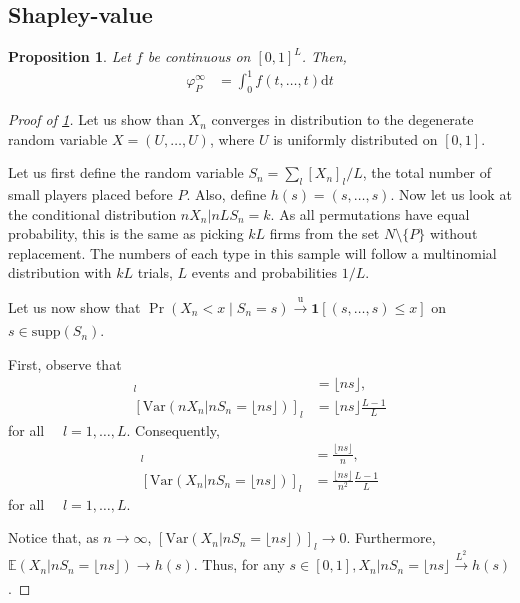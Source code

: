 \documentclass[a4paper]{article}
\newtheorem{proposition}{Proposition}
\newcommand{\dt}{\mathrm{d}t}
\newcommand{\E}{\mathbb{E}}
\newcommand{\Var}{\mathrm{Var}}
\begin{document}
\subsection{Shapley-value}

\begin{proposition}
    \label{prop:many_sided_shapley}
    Let $f$ be continuous on $[0, 1]^L$.
    Then,
    \begin{align*}
        \varphi_P^\infty & = \int_0^1 f(t, \dots, t) \dt
    \end{align*}
\end{proposition}

\begin{proof}[Proof of \cref{prop:many_sided_shapley}]
    Let us show than $X_n$ converges in distribution to the degenerate random variable $X = (U, \dots, U)$, where $U$ is uniformly distributed on $[0, 1]$.

    Let us first define the random variable $S_n = \sum_l[X_n]_l / L$, the total number of small players placed before $P$.
    Also, define $h(s) = (s, \dots, s)$.
    Now let us look at the conditional distribution $n X_n | n L S_n = k$.
    As all permutations have equal probability, this is the same as picking $kL$ firms from the set $N \setminus \{P\}$ without replacement.
    The numbers of each type in this sample will follow a multinomial distribution with $kL$ trials, $L$ events and probabilities $1/L$.

    Let us now show that $\Pr(X_n < x \mid S_n = s) \xrightarrow[]{\mathrm{u}} \mathbf{1}[(s, \dots, s) \leq x]$ on $s \in \mathrm{supp}(S_n)$.

    First, observe that
    \begin{align*}
        [\E(n X_n | nS_n = \lfloor ns \rfloor)]_l &= \lfloor ns \rfloor, \\
        [\Var(n X_n | nS_n = \lfloor ns \rfloor)]_l &= \lfloor ns \rfloor \frac{L-1}{L}
    \end{align*}
    for all $\quad l = 1, \dots, L$.
    Consequently,
    \begin{align*}
        [\E(X_n | nS_n = \lfloor ns \rfloor)]_l &= \frac{\lfloor ns \rfloor}{n}, \\
        [\Var(X_n | nS_n = \lfloor ns \rfloor)]_l &= \frac{\lfloor ns \rfloor}{n^2} \frac{L-1}{L}
    \end{align*}
    for all $\quad l = 1, \dots, L$.

    Notice that, as $n \to \infty$, $[\Var(X_n | nS_n = \lfloor ns \rfloor)]_l \to 0$.
    Furthermore, $\E(X_n | nS_n = \lfloor ns \rfloor) \to h(s)$.
    Thus, for any $s \in [0, 1], X_n | nS_n = \lfloor ns \rfloor \xrightarrow[]{L^2} h(s)$.


\end{proof}
\end{document}
